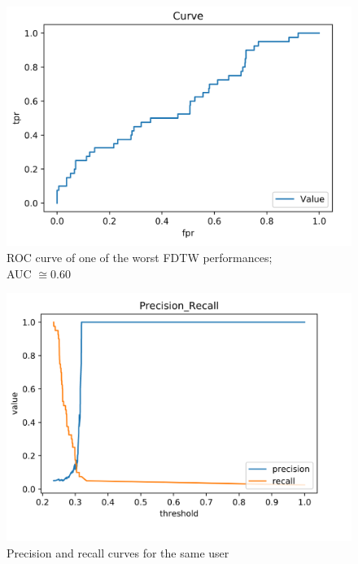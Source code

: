\documentclass[8pt,notitlepage]{report}
\begin{document}
			\begin{figure}[H]
				\begin{center}
					\includegraphics[scale=.35]{ROC_FDTW_Dario}
					\caption{ROC curve of one of the worst FDTW performances;\\ AUC $ \cong 0.60 $}
				\end{center}
			\end{figure}
			
			\begin{figure}[H]
				\begin{center}
					\includegraphics[scale=.35]{precision_recall_FDTW_Dario}
					\caption{Precision and recall curves for the same user}
				\end{center}
			\end{figure}
			
\end{document}
